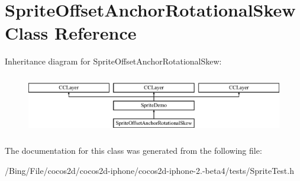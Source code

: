 \hypertarget{interface_sprite_offset_anchor_rotational_skew}{\section{Sprite\-Offset\-Anchor\-Rotational\-Skew Class Reference}
\label{interface_sprite_offset_anchor_rotational_skew}
}
Inheritance diagram for Sprite\-Offset\-Anchor\-Rotational\-Skew\-:\begin{figure}[H]
\begin{center}
\leavevmode
\includegraphics[height=2.616822cm]{interface_sprite_offset_anchor_rotational_skew}
\end{center}
\end{figure}


The documentation for this class was generated from the following file\-:\begin{DoxyCompactItemize}
\item 
/\-Bing/\-File/cocos2d/cocos2d-\/iphone/cocos2d-\/iphone-\/2.-\/beta4/tests/Sprite\-Test.\-h\end{DoxyCompactItemize}
